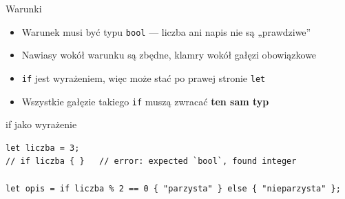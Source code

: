 \begin{frame}[fragile]{Warunki}
  \begin{itemize}
    \item Warunek musi być typu \texttt{bool} --- liczba ani napis nie są „prawdziwe''
    \item Nawiasy wokół warunku są zbędne, klamry wokół gałęzi obowiązkowe
    \item \texttt{if} jest wyrażeniem, więc może stać po prawej stronie \texttt{let}
    \item Wszystkie gałęzie takiego \texttt{if} muszą zwracać \textbf{ten sam typ}
  \end{itemize}
  \begin{block}{if jako wyrażenie}
\begin{lstlisting}
let liczba = 3;
// if liczba { }   // error: expected `bool`, found integer

let opis = if liczba % 2 == 0 { "parzysta" } else { "nieparzysta" };
\end{lstlisting}
  \end{block}
\end{frame}


